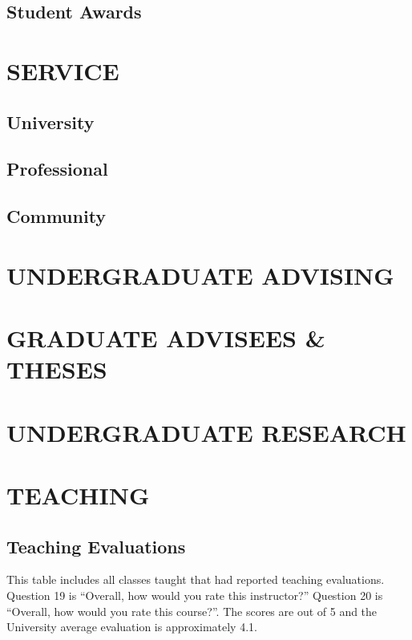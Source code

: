 \documentclass[10pt]{article}
\begin{document}
\subsection{Student Awards}


\section{SERVICE}
\subsection{University}



\subsection{Professional}


\subsection{Community}

\section{UNDERGRADUATE ADVISING}



\section{GRADUATE ADVISEES \& THESES}


\section{UNDERGRADUATE RESEARCH}


\section{TEACHING}
\subsection{Teaching Evaluations}
This table includes all classes taught that had reported teaching evaluations.  Question 19 is ``Overall, how would you rate this instructor?''  Question 20 is ``Overall, how would you rate this course?''. The scores are out of 5 and the University average evaluation is approximately 4.1. 

\end{document}
